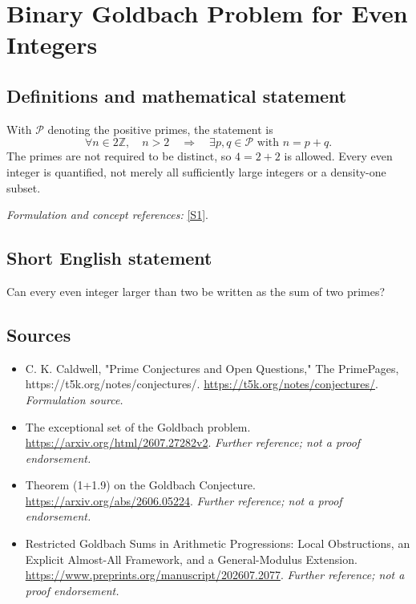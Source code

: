 \documentclass[11pt]{article}
\begin{document}
\section*{\texorpdfstring{Binary Goldbach Problem for Even Integers}{Binary Goldbach Problem for Even Integers}}\label{25}
\subsection{Definitions and mathematical statement}
With $\mathcal P$ denoting the positive primes, the statement is
\[
 \forall n\in2{\mathbb{Z}},\quad n>2\quad\Longrightarrow\quad
 \exists p,q\in\mathcal P\text{ with }n=p+q.
\]
The primes are not required to be distinct, so $4=2+2$ is allowed. Every even integer is quantified, not merely all sufficiently large integers or a density-one subset.
\par\smallskip\textit{Formulation and concept references:} \href{https://t5k.org/notes/conjectures/}{[S1]}.

\subsection{Short English statement}
Can every even integer larger than two be written as the sum of two primes?
\subsection{Sources}
\begin{itemize}
\item[S1]C. K. Caldwell, "Prime Conjectures and Open Questions," The PrimePages, https://t5k.org/notes/conjectures/.
\url{https://t5k.org/notes/conjectures/}.
\textit{Formulation source.}
\item[S2]The exceptional set of the Goldbach problem.
\url{https://arxiv.org/html/2607.27282v2}.
\textit{Further reference; not a proof endorsement.}
\item[S3]Theorem (1+1.9) on the Goldbach Conjecture.
\url{https://arxiv.org/abs/2606.05224}.
\textit{Further reference; not a proof endorsement.}
\item[S4]Restricted Goldbach Sums in Arithmetic Progressions: Local Obstructions, an Explicit Almost-All Framework, and a General-Modulus Extension.
\url{https://www.preprints.org/manuscript/202607.2077}.
\textit{Further reference; not a proof endorsement.}
\end{itemize}
\end{document}
